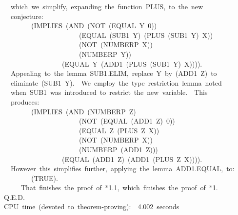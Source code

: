 \documentclass[11pt]{book}
\newenvironment{pubasis}{\begin{flushleft}\ttfamily\small}{\normalsize\rmfamily\end{flushleft}}
\begin{document}
\begin{pubasis}
~~which~we~simplify,~expanding~the~function~PLUS,~to~the~new\\
~~conjecture:\\

~~~~~~~~(IMPLIES~(AND~(NOT~(EQUAL~Y~0))\\
~~~~~~~~~~~~~~~~~~~~~~(EQUAL~(SUB1~Y)~(PLUS~(SUB1~Y)~X))\\
~~~~~~~~~~~~~~~~~~~~~~(NOT~(NUMBERP~X))\\
~~~~~~~~~~~~~~~~~~~~~~(NUMBERP~Y))\\
~~~~~~~~~~~~~~~~~(EQUAL~Y~(ADD1~(PLUS~(SUB1~Y)~X)))).\\

~~Appealing~to~the~lemma~SUB1.ELIM,~replace~Y~by~(ADD1~Z)~to\\
~~eliminate~(SUB1~Y).~~We~employ~the~type~restriction~lemma~noted\\
~~when~SUB1~was~introduced~to~restrict~the~new~variable.~~This\\
~~produces:\\

~~~~~~~~(IMPLIES~(AND~(NUMBERP~Z)\\
~~~~~~~~~~~~~~~~~~~~~~(NOT~(EQUAL~(ADD1~Z)~0))\\
~~~~~~~~~~~~~~~~~~~~~~(EQUAL~Z~(PLUS~Z~X))\\
~~~~~~~~~~~~~~~~~~~~~~(NOT~(NUMBERP~X))\\
~~~~~~~~~~~~~~~~~~~~~~(NUMBERP~(ADD1~Z)))\\
~~~~~~~~~~~~~~~~~(EQUAL~(ADD1~Z)~(ADD1~(PLUS~Z~X)))).\\

~~However~this~simplifies~further,~applying~the~lemma~ADD1.EQUAL,~to:\\

~~~~~~~~(TRUE).\\

~~~~~That~finishes~the~proof~of~*1.1,~which~finishes~the~proof~of~*1.\\
Q.E.D.\\

CPU~time~(devoted~to~theorem-proving):~~4.002~seconds\\
\end{pubasis}
\end{document}
